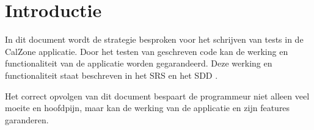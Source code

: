 \chapter{Introductie}
In dit document wordt de strategie besproken voor het schrijven van tests in de CalZone\cite{calzone} applicatie. Door het testen van geschreven code kan de werking en functionaliteit van de applicatie worden gegarandeerd. Deze werking en functionaliteit staat beschreven in het SRS \cite{srs} en het SDD \cite{sdd}.

Het correct opvolgen van dit document bespaart de programmeur niet alleen veel moeite en hoofdpijn, maar kan de werking van de applicatie en zijn features garanderen. 